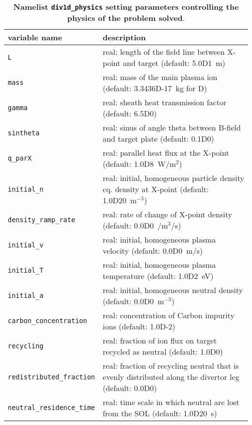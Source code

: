 \documentclass[amsmath,amssymb,a4]{revtex4}
\begin{document}
\begin{table}[h]
\begin{center}
  \caption{{\bf Namelist {\tt div1d\_physics} setting parameters controlling the physics of the problem solved}.}
  \label{tab:input_numerics}
  \begin{tabular}{|| l  | l ||}
    \hline\hline
    variable name                & description \\ \hline\hline
    {\tt L}                      & real: length of the field line between X-point and target (default: 5.0D1~m) \\ \hline
    {\tt mass}                   & real: mass of the main plasma ion (default: 3.3436D-17~kg for D) \\ \hline
    {\tt gamma}                  & real: sheath heat transmission factor (default: 6.5D0) \\ \hline
    {\tt sintheta}               & real: sinus of angle theta between B-field and target plate (default: 0.1D0) \\ \hline
    {\tt q\_parX}                & real: parallel heat flux at the X-point (default: 1.0D8~W/m$^2$) \\ \hline
    {\tt initial\_n}             & real: initial, homogeneous particle density cq. density at X-point (default: 1.0D20~m$^{-3}$) \\ \hline
    {\tt density\_ramp\_rate}    & real: rate of change of X-point density (default: 0.0D0~/m$^3$/s) \\ \hline
    {\tt initial\_v}             & real: initial, homogeneous plasma velocity (default: 0.0D0~m/s) \\ \hline
    {\tt initial\_T}             & real: initial, homogeneous plasma temperature (default: 1.0D2~eV) \\ \hline
    {\tt initial\_a}             & real: initial, homogeneous neutral density (default: 0.0D0~m$^{-3}$) \\ \hline
    {\tt carbon\_concentration}  & real: concentration of Carbon impurity ions (default: 1.0D-2) \\ \hline
    {\tt recycling}              & real: fraction of ion flux on target recycled as neutral (default: 1.0D0) \\ \hline
    {\tt redistributed\_fraction}& real: fraction of recycling neutral that is evenly distributed along the divertor leg (default: 0.0D0) \\ \hline
    {\tt neutral\_residence\_time}& real: time scale in which neutral are lost from the SOL (default: 1.0D20~s) \\ \hline

\end{tabular}
\end{center}
\end{table}
\end{document}
